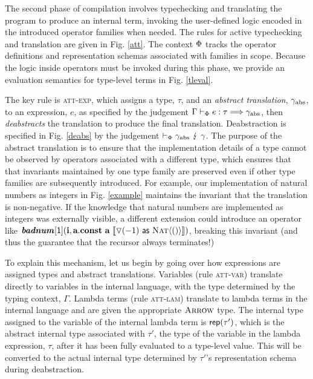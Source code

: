 \documentclass{llncs}
\begin{document}
The second phase of compilation involves typechecking and translating the program to produce an internal term, invoking the user-defined logic encoded in the introduced operator families when needed. The rules for active typechecking and translation are given in Fig. \ref{att}. The context $\Phi$ tracks the operator definitions and representation schemas associated with families in scope. Because the logic inside operators must be invoked during this phase, we provide an evaluation semantics for type-level terms in Fig. \ref{tleval}. 

The key rule is \textsc{att-exp}, which assigns a type, $\tau$, and an \emph{abstract translation}, $\gamma_{\text{abs}}$, to an expression, $e$, as specified by the judgement $\Gamma \vdash_{\Phi} e : \tau \Longrightarrow \gamma_{\text{abs}}$, then \emph{deabstracts} the translation to produce the final translation. Deabstraction is specified in Fig. \ref{deabs} by the judgement $\vdash_{\Phi} \gamma_{\text{abs}} ~\lightning~ \gamma$. The purpose of the abstract translation is to ensure that the implementation details of a type cannot be observed by operators associated with a different type, which ensures that that invariants maintained by one type family are preserved even if other type families are subsequently introduced. For example, our implementation of natural numbers as integers in Fig. \ref{example} maintains the invariant that the translation is non-negative. If the knowledge that natural numbers are implemented as integers was externally visible, a different extension could introduce an operator like $\textbf{\textit{badnum}}[\textsf{1}]({\textbf{i}},{\textbf{a}}.{\textbf{const}}~{\textbf{a}}~\llbracket \triangledown(-1)~{\sf as}~\textsc{Nat}\langle()\rangle \rrbracket)$, breaking this invariant (and thus the guarantee that the recursor always terminates!)

To explain this mechanism, let us begin by going over how expressions are assigned types and abstract translations. Variables  (rule \textsc{att-var}) translate directly to variables in the internal language, with the type determined by the typing context, $\Gamma$. Lambda terms (rule \textsc{att-lam}) translate to lambda terms in the internal language and are given the appropriate $\textsc{Arrow}$ type. The internal type assigned to the variable of the internal lambda term is ${\sf rep}(\tau')$, which is the abstract internal type associated with $\tau'$, the type of the variable in the lambda expression, $\tau$, after it has been fully evaluated to a type-level value. This will be converted to the actual internal type determined by $\tau'$'s representation schema during deabstraction.
\end{document}
